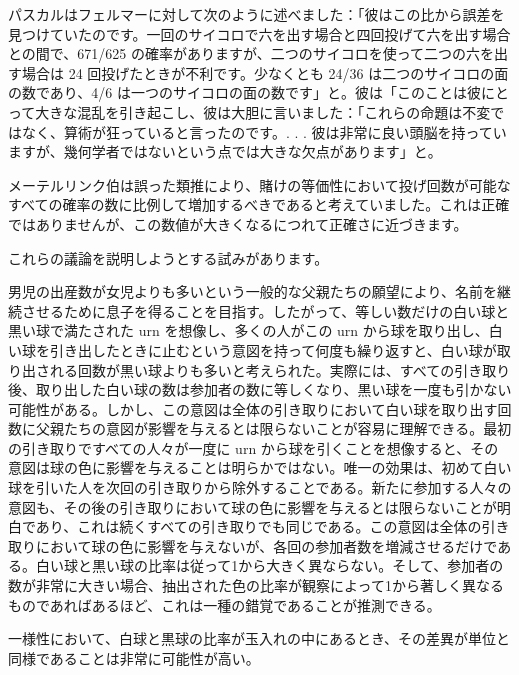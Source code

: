 \documentclass[a4paper,11pt,openany]{ltjsbook}
\begin{document}
パスカルはフェルマーに対して次のように述べました：「彼はこの比から誤差を見つけていたのです。一回のサイコロで六を出す場合と四回投げて六を出す場合との間で、671/625 の確率がありますが、二つのサイコロを使って二つの六を出す場合は 24 回投げたときが不利です。少なくとも 24/36 は二つのサイコロの面の数であり、4/6 は一つのサイコロの面の数です」と。彼は「このことは彼にとって大きな混乱を引き起こし、彼は大胆に言いました：「これらの命題は不変ではなく、算術が狂っていると言ったのです。. . . 彼は非常に良い頭脳を持っていますが、幾何学者ではないという点では大きな欠点があります」と。

メーテルリンク伯は誤った類推により、賭けの等価性において投げ回数が可能なすべての確率の数に比例して増加するべきであると考えていました。これは正確ではありませんが、この数値が大きくなるにつれて正確さに近づきます。

これらの議論を説明しようとする試みがあります。

男児の出産数が女児よりも多いという一般的な父親たちの願望により、名前を継続させるために息子を得ることを目指す。したがって、等しい数だけの白い球と黒い球で満たされた urn を想像し、多くの人がこの urn から球を取り出し、白い球を引き出したときに止むという意図を持って何度も繰り返すと、白い球が取り出される回数が黒い球よりも多いと考えられた。実際には、すべての引き取り後、取り出した白い球の数は参加者の数に等しくなり、黒い球を一度も引かない可能性がある。しかし、この意図は全体の引き取りにおいて白い球を取り出す回数に父親たちの意図が影響を与えるとは限らないことが容易に理解できる。最初の引き取りですべての人々が一度に urn から球を引くことを想像すると、その意図は球の色に影響を与えることは明らかではない。唯一の効果は、初めて白い球を引いた人を次回の引き取りから除外することである。新たに参加する人々の意図も、その後の引き取りにおいて球の色に影響を与えるとは限らないことが明白であり、これは続くすべての引き取りでも同じである。この意図は全体の引き取りにおいて球の色に影響を与えないが、各回の参加者数を増減させるだけである。白い球と黒い球の比率は従って1から大きく異ならない。そして、参加者の数が非常に大きい場合、抽出された色の比率が観察によって1から著しく異なるものであればあるほど、これは一種の錯覚であることが推測できる。

一様性において、白球と黒球の比率が玉入れの中にあるとき、その差異が単位と同様であることは非常に可能性が高い。
\end{document}
